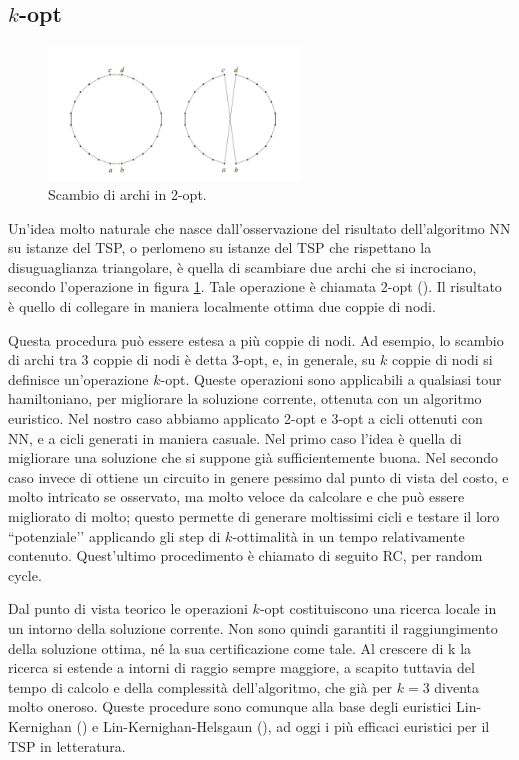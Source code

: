 \subsection{$k$-opt}
\begin{figure}
  \begin{center}
    \includegraphics[width=0.6\textwidth]{images/2opt}
    \caption{Scambio di archi in 2-opt.}
    \label{fig:2opt}
  \end{center}
\end{figure}
Un’idea molto naturale che nasce dall’osservazione del risultato dell’algoritmo NN su istanze del TSP, o perlomeno su istanze del TSP che rispettano la disuguaglianza triangolare, è quella di scambiare due archi che si incrociano, secondo l’operazione in figura \ref{fig:2opt}. Tale operazione è chiamata 2-opt (\citet*{croes1958method}). Il risultato è quello di collegare in maniera localmente ottima due coppie di nodi.

Questa procedura può essere estesa a più coppie di nodi. Ad esempio, lo scambio di archi tra 3 coppie di nodi è detta 3-opt, e, in generale, su $k$ coppie di nodi si definisce un’operazione $k$-opt. Queste operazioni sono applicabili a qualsiasi tour hamiltoniano, per migliorare la soluzione corrente, ottenuta con un algoritmo euristico. Nel nostro caso abbiamo applicato 2-opt e 3-opt a cicli ottenuti con NN, e a cicli generati in maniera casuale. Nel primo caso l’idea è quella di migliorare una soluzione che si suppone già sufficientemente buona. Nel secondo caso invece di ottiene un circuito in genere pessimo dal punto di vista del costo, e molto intricato se osservato, ma molto veloce da calcolare e che può essere migliorato di molto; questo permette di generare moltissimi cicli e testare il loro ``potenziale’’ applicando gli step di $k$-ottimalità in un tempo relativamente contenuto. Quest'ultimo procedimento è chiamato di seguito RC, per random cycle.

Dal punto di vista teorico le operazioni $k$-opt costituiscono una ricerca locale in un intorno della soluzione corrente. Non sono quindi garantiti il raggiungimento della soluzione ottima, né la sua certificazione come tale. Al crescere di k la ricerca si estende a intorni di raggio sempre maggiore, a scapito tuttavia del tempo di calcolo e della complessità dell’algoritmo, che già per $k=3$ diventa molto oneroso. Queste procedure sono comunque alla base degli euristici Lin-Kernighan (\citet*{lin1973effective}) e Lin-Kernighan-Helsgaun (\citet*{helsgaun2000effective}), ad oggi i più efficaci euristici per il TSP in letteratura.

